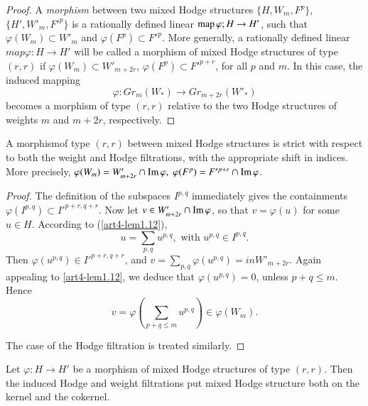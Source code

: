 \begin{proof}
A \textit{morphism} between two mixed Hodge structures $\{H, W_m, F^p\}$,\break $\{H', W'_m, F'^p\}$ is a rationally defined linear $\operatorname{map} \varphi; H \to H'$, such that $\varphi(W_m) \subset W'_m$ and $\varphi (F^p) \subset F'^p$. More generally, a rationally defined linear $map \varphi : H \to H'$ will be called a morphism of mixed Hodge structures of type $(r,r)$ if $\varphi (W_m) \subset W'_{m+2r}$, $\varphi (F^p) \subset F'^{p+r}$, for all $p$ and $m$. In this case, the induced mapping
$$
\varphi: Gr_m (W_\ast) \to Gr_{m+2r} (W'_\ast)
$$
becomes a morphism of type $(r,r)$ relative to the two Hodge structures of weights $m$ and $m+ 2r$, respectively.
\end{proof}

\begin{lemma}\label{art4-lem1.13}
A morphism\pageoriginale of type $(r,r)$ between mixed Hodge structures is strict with respect to both the weight and Hodge filtrations, with the appropriate shift in indices. More precisely, $\varphi (W_m) = W'_{m+2r} \cap \operatorname{Im} \varphi, \; \varphi (F^p) = F'^{p+r} \cap \operatorname{Im} \varphi$.
\end{lemma}

\begin{proof}
The definition of the subspaces $I^{p,q}$ immediately gives the containments $\varphi(I^{p,q}) \subset I'^{p+r, q+r}$. Now let $v \in W'_{m+2r} \cap \operatorname{Im} \varphi$, so that $v = \varphi (u)$ for some $u \in H$. According to (\ref{art4-lem1.12}),
$$
u = \sum_{p,q} u^{p,q}, \text{ with } u^{p,q} \in I^{p,q}.
$$
Then $\varphi (u^{p,q}) \in I'^{p+r , q+r}$, and $v =\sum_{p,q} \varphi (u^{p,q}) =in W'_{m+2r}$. Again appealing to \ref{art4-lem1.12}, we deduce that $\varphi(u^{p,q}) =0$, unless $p+q \leqslant m$. Hence
$$
v = \varphi \left(\sum_{p+q \leq m} u^{p,q} \right) \in \varphi (W_m).
$$

The case of the Hodge filtration is treated similarly.
\end{proof}

\begin{lemma}\label{art4-lem1.14}
Let $\varphi: H \to H'$ be a morphism of mixed Hodge structures of type $(r,r)$. Then the induced Hodge and weight filtrations put mixed Hodge structure both on the kernel and the cokernel.
\end{lemma}

